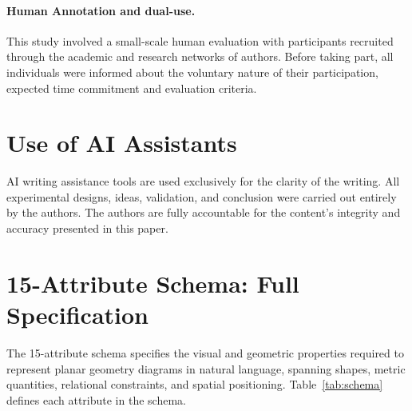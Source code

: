 \documentclass[11pt]{article}
\begin{document}
\paragraph{Human Annotation and dual-use.} This study involved a small-scale human evaluation with participants recruited through the academic and research networks of authors. Before taking part, all individuals were informed about the voluntary nature of their participation, expected time commitment and evaluation criteria.

\section*{Use of AI Assistants} AI writing assistance tools are used exclusively for the clarity of the writing. All experimental designs, ideas, validation, and conclusion were carried out entirely by the authors. The authors are fully accountable for the content's integrity and accuracy presented in this paper.




\appendix
\raggedbottom
\section{15-Attribute Schema: Full Specification}
\label{app:schema}

The 15-attribute schema specifies the visual and geometric properties required to represent planar geometry diagrams in natural language, spanning shapes, metric quantities, relational constraints, and spatial positioning. Table~\ref{tab:schema} defines each attribute in the schema.
\end{document}
